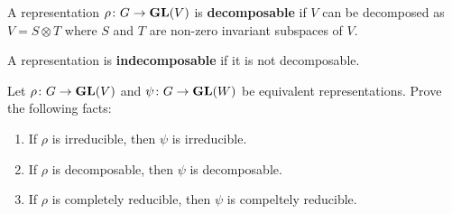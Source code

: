 \begin{definition}
A representation
$\rho\colon G\to\mathbf{GL}(V)$ is \textbf{decomposable} if $V$ can be decomposed as $V=S\otimes T$
where $S$ and $T$ are non-zero invariant subspaces of $V$. 
\end{definition}

A representation is 
\textbf{indecomposable} if it is not decomposable. 

\begin{exercise}
\label{xca:equivalence}
	Let $\rho\colon G\to\mathbf{GL}(V)$ and $\psi\colon G\to\mathbf{GL}(W)$ be equivalent representations.
	Prove the following facts:
	\begin{enumerate}
		\item If $\rho$ is irreducible, then $\psi$ is irreducible.
		\item If $\rho$ is decomposable, then $\psi$ is decomposable.
		\item If $\rho$ is completely reducible, then $\psi$ is compeltely reducible. 
	\end{enumerate}	
\end{exercise}

